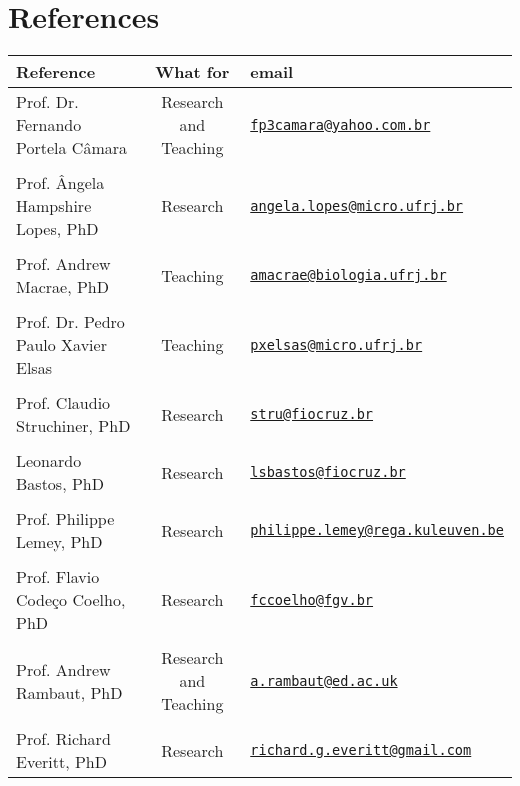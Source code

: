 \documentclass[10pt]{article}
\newcommand\VRule{\color{lightgray}\vrule width 0.5pt}
\begin{document}
\section*{References}
\begin{tabular}{lcl}%
\toprule
Reference & What for & email \\
\midrule
Prof. Dr. Fernando Portela C\^amara& Research and Teaching & \href{mailto:fp3camara@yahoo.com.br}{\nolinkurl{fp3camara@yahoo.com.br}}\\
\\
Prof. \^Angela Hampshire Lopes, PhD & Research & \href{mailto:angela.lopes@micro.ufrj.br}{\nolinkurl{angela.lopes@micro.ufrj.br}}\\
\\
Prof. Andrew Macrae, PhD&Teaching & \href{mailto:amacrae@biologia.ufrj.br}{\nolinkurl{amacrae@biologia.ufrj.br}}\\
\\
Prof. Dr. Pedro Paulo Xavier Elsas & Teaching & \href{mailto:pxelsas@micro.ufrj.br}{\nolinkurl{pxelsas@micro.ufrj.br}}\\
\\
Prof. Claudio Struchiner, PhD & Research &  \href{mailto:stru@fiocruz.br}{\nolinkurl{stru@fiocruz.br}} \\
\\
Leonardo Bastos, PhD &Research&  \href{mailto:lsbastos@fiocruz.br}{\nolinkurl{lsbastos@fiocruz.br}} \\
\\
Prof. Philippe Lemey, PhD & Research & \href{mailto:philippe.lemey@rega.kuleuven.be}{\nolinkurl{philippe.lemey@rega.kuleuven.be}}\\
\\
Prof. Flavio Code\c{c}o Coelho, PhD & Research & \href{mailto:fccoelho@fgv.br}{\nolinkurl{fccoelho@fgv.br}}\\
\\
Prof. Andrew Rambaut, PhD & Research and Teaching & \href{mailto:a.rambaut@ed.ac.uk }{\nolinkurl{a.rambaut@ed.ac.uk}}\\
\\
Prof. Richard Everitt, PhD & Research & \href{mailto:richard.g.everitt@gmail.com}{\nolinkurl{richard.g.everitt@gmail.com}}\\
\bottomrule
\end{tabular}
\end{document}
